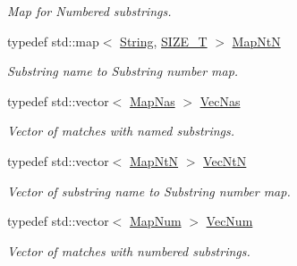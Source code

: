 \begin{DoxyCompactItemize}
\begin{DoxyCompactList}\small\item\em Map for Numbered substrings. \end{DoxyCompactList}\item 
typedef std\+::map$<$ \hyperlink{namespacejpcre2_a91f03070152fb228bc116c5a737f1d16}{String}, \hyperlink{namespacejpcre2_a2aac465ddcb123560c7c8215dd69246c}{S\+I\+Z\+E\+\_\+T} $>$ \hyperlink{namespacejpcre2_a753ebedfb8caf4a16ffbf47d8d705656}{Map\+NtN}\hypertarget{namespacejpcre2_a753ebedfb8caf4a16ffbf47d8d705656}{}\label{namespacejpcre2_a753ebedfb8caf4a16ffbf47d8d705656}

\begin{DoxyCompactList}\small\item\em Substring name to Substring number map. \end{DoxyCompactList}\item 
typedef std\+::vector$<$ \hyperlink{namespacejpcre2_a20bd901c9ca3c949806aa6b9e324f6cf}{Map\+Nas} $>$ \hyperlink{namespacejpcre2_a2b121ae776ea5b2913839f418a7d856b}{Vec\+Nas}\hypertarget{namespacejpcre2_a2b121ae776ea5b2913839f418a7d856b}{}\label{namespacejpcre2_a2b121ae776ea5b2913839f418a7d856b}

\begin{DoxyCompactList}\small\item\em Vector of matches with named substrings. \end{DoxyCompactList}\item 
typedef std\+::vector$<$ \hyperlink{namespacejpcre2_a753ebedfb8caf4a16ffbf47d8d705656}{Map\+NtN} $>$ \hyperlink{namespacejpcre2_a88a7aaf84cad627d34c8152e726168eb}{Vec\+NtN}\hypertarget{namespacejpcre2_a88a7aaf84cad627d34c8152e726168eb}{}\label{namespacejpcre2_a88a7aaf84cad627d34c8152e726168eb}

\begin{DoxyCompactList}\small\item\em Vector of substring name to Substring number map. \end{DoxyCompactList}\item 
typedef std\+::vector$<$ \hyperlink{namespacejpcre2_a947e37f0e4a1678157e7f1f855638e82}{Map\+Num} $>$ \hyperlink{namespacejpcre2_ac1cf752c8fbb0be78020be3b80e77ce3}{Vec\+Num}\hypertarget{namespacejpcre2_ac1cf752c8fbb0be78020be3b80e77ce3}{}\label{namespacejpcre2_ac1cf752c8fbb0be78020be3b80e77ce3}

\begin{DoxyCompactList}\small\item\em Vector of matches with numbered substrings. \end{DoxyCompactList}\end{DoxyCompactItemize}

